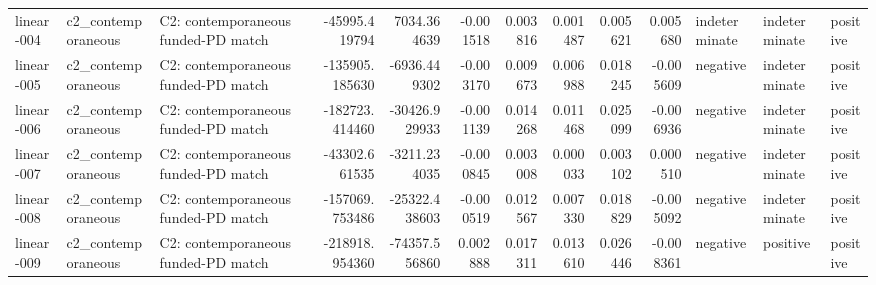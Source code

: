 \begin{tabular}{lllrrrrrrrlll}
linear-004 & c2\_contemporaneous & C2: contemporaneous funded-PD match & -45995.419794 & 7034.364639 & -0.001518 & 0.003816 & 0.001487 & 0.005621 & 0.005680 & indeterminate & indeterminate & positive \\
linear-005 & c2\_contemporaneous & C2: contemporaneous funded-PD match & -135905.185630 & -6936.449302 & -0.003170 & 0.009673 & 0.006988 & 0.018245 & -0.005609 & negative & indeterminate & positive \\
linear-006 & c2\_contemporaneous & C2: contemporaneous funded-PD match & -182723.414460 & -30426.929933 & -0.001139 & 0.014268 & 0.011468 & 0.025099 & -0.006936 & negative & indeterminate & positive \\
linear-007 & c2\_contemporaneous & C2: contemporaneous funded-PD match & -43302.661535 & -3211.234035 & -0.000845 & 0.003008 & 0.000033 & 0.003102 & 0.000510 & negative & indeterminate & positive \\
linear-008 & c2\_contemporaneous & C2: contemporaneous funded-PD match & -157069.753486 & -25322.438603 & -0.000519 & 0.012567 & 0.007330 & 0.018829 & -0.005092 & negative & indeterminate & positive \\
linear-009 & c2\_contemporaneous & C2: contemporaneous funded-PD match & -218918.954360 & -74357.556860 & 0.002888 & 0.017311 & 0.013610 & 0.026446 & -0.008361 & negative & positive & positive \\
\bottomrule
\end{tabular}
